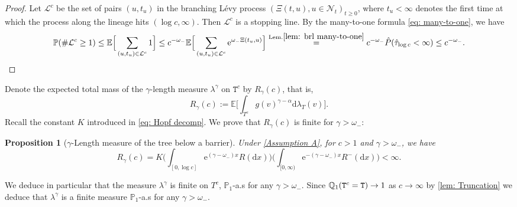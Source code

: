 \documentclass[12pt]{article}
\numberwithin{equation}{section}
\theoremstyle{plain}
\newtheorem{prop}[thm]{Proposition}
\theoremstyle{definition}
\newcommand{\D}{\mathrm{d}}
\begin{document}
\begin{proof}
Let $\mathcal{L}^c$ be the set of pairs $(u,t_u)$ in the branching L\'evy process $(\Xi(t,u), u\in \mathcal{N}_t)_{t\ge 0}$, where $t_u<\infty$ denotes the first time at which the process along the lineage hits $(\log c,\infty)$. Then $\mathcal{L}^c$ is a stopping line. By the many-to-one formula \eqref{eq: many-to-one}, we have
\[\mathbb{P}(\#\mathcal{L}^c\geq 1)\leq \mathbb{E}\Big[\sum_{(u, t_u)\in \mathcal{L}^c} 1\Big]\leq c^{-\omega_-}\mathbb{E}\Big[\sum_{(u, t_u)\in \mathcal{L}^c} \mathrm{e}^{\omega_- \Xi(t_u,u)}\Big] \stackrel{\mathrm{Lem.}\ref{lem: brl many-to-one}}{=} c^{-\omega_-}\hat{P}(\hat{\tau}_{\log c} < \infty) \leq  c^{-\omega_-}. \]
\end{proof}
Denote the expected total mass of the $\gamma$-length measure $\lambda^\gamma$ on $\mathtt{T}^c$ by $R_{\gamma}(c)$, that is,
\begin{equation}
R_{\gamma}(c) := \mathbb{E}\bigg[\int_{T^{c}} g(v)^{\gamma-\alpha}\D \lambda_{T}(v) \bigg].
\end{equation}
\noindent Recall the constant $K$ introduced in \eqref{eq: Hopf decomp}. We prove that $R_{\gamma}(c)$ is finite for $\gamma>\omega_-$:

\begin{prop}[$\gamma$-Length measure of the tree below a barrier]\label{prop: expected length}
Under \cref{Assumption A}, for $c>1$ and $\gamma>\omega_-$, we have
\begin{equation}\label{eq: expected length}
R_{\gamma}(c) = K\bigg(\int_{[0, \log c]}\mathrm{e}^{(\gamma-\omega_-)x}R(\D x)\bigg)\bigg(\int_{[0,\infty)}\mathrm{e}^{-(\gamma-\omega_-)x}R^-(\D x)\bigg)<\infty.
\end{equation}
\end{prop}

We deduce in particular that the measure $\lambda^{\gamma}$ is finite on $T^c$, $\mathbb{P}_1$-a.s for any $\gamma>\omega_-$. Since $\mathbb{Q}_1({\tt T}^c = {\tt T}) \to 1$ as $c\to\infty$ by \cref{lem: Truncation} we deduce that $\lambda^{\gamma}$ is a finite measure $\mathbb{P}_1$-a.s for any $\gamma > \omega_-$.
\end{document}
